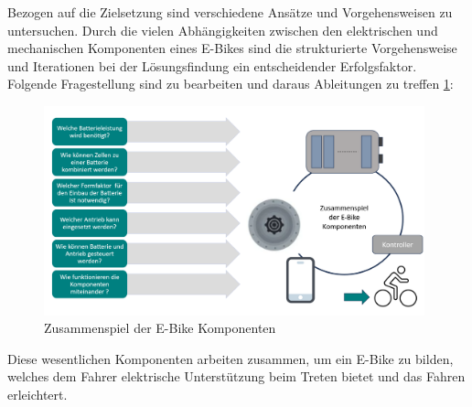Bezogen auf die Zielsetzung sind verschiedene Ansätze und Vorgehensweisen zu untersuchen.
Durch die vielen Abhängigkeiten zwischen den elektrischen und mechanischen Komponenten eines E-Bikes sind die strukturierte Vorgehensweise und Iterationen bei der Lösungsfindung ein entscheidender Erfolgsfaktor.
Folgende Fragestellung sind zu bearbeiten und daraus Ableitungen zu treffen \ref{fig:Komponenten}:


\begin{figure}[h]
    \centering
    \includegraphics[width=11cm]{images/Flussdiagramm_E-bike.png}
    \caption{Zusammenspiel der E-Bike Komponenten}
    \label{fig:Komponenten}
\end{figure}


Diese wesentlichen Komponenten arbeiten zusammen, um ein E-Bike zu bilden, welches dem Fahrer elektrische Unterstützung beim Treten bietet und das Fahren erleichtert.